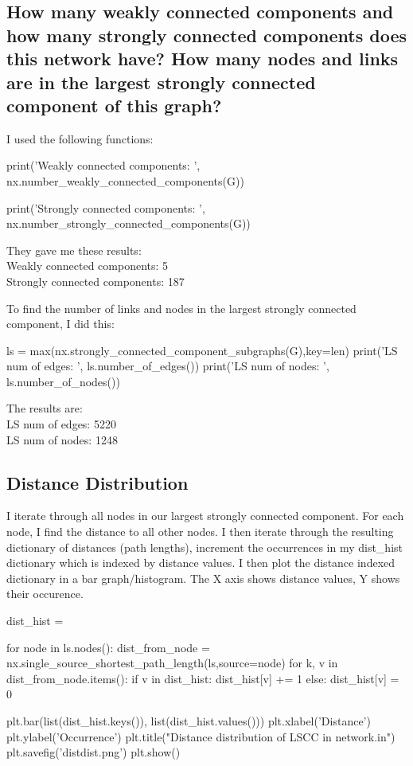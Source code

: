 \documentclass[12pt]{amsart}
\begin{document}
\subsection{How many weakly connected components and how many strongly connected components does this network have? How many nodes and links are in the largest strongly connected component of this graph?}

I used the following functions:

\begin{python}
print('Weakly connected components: ',
  nx.number_weakly_connected_components(G))

print('Strongly connected components: ',
  nx.number_strongly_connected_components(G))
\end{python}

They gave me these results:\\
Weakly connected components:  5\\
Strongly connected components:  187


To find the number of links and nodes in the largest strongly connected component, I did this:

\begin{python}
ls = max(nx.strongly_connected_component_subgraphs(G),key=len)
print('LS num of edges: ', ls.number_of_edges())
print('LS num of nodes: ', ls.number_of_nodes())
\end{python}

The results are: \\
LS num of edges:  5220 \\
LS num of nodes:  1248

\subsection{Distance Distribution}

I iterate through all nodes in our largest strongly connected component. For each node, I find the distance to all other nodes. I then iterate through the resulting dictionary of distances (path lengths), increment the occurrences in my dist_hist dictionary which is indexed by distance values.
I then plot the distance indexed dictionary in a bar graph/histogram. The X axis shows distance values, Y shows their occurence.


\begin{python}
dist_hist = {}

for node in ls.nodes():
    dist_from_node = nx.single_source_shortest_path_length(ls,source=node)
    for k, v in dist_from_node.items():
        if v in dist_hist:
            dist_hist[v] += 1
        else:
            dist_hist[v] = 0

plt.bar(list(dist_hist.keys()), list(dist_hist.values()))
plt.xlabel('Distance')
plt.ylabel('Occurrence')
plt.title("Distance distribution of LSCC in network.in")
plt.savefig('distdist.png')
plt.show()
\end{python}
\end{document}
